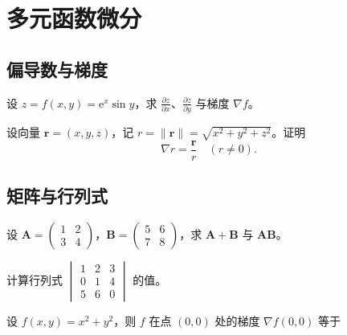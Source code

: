 \documentclass[answersection,pad]{kiritex}
\begin{document}
\section{多元函数微分}

\subsection{偏导数与梯度}

\begin{problem}
  设 $z=f(x,y)=\mathrm{e}^{x}\sin y$，求 $\displaystyle\frac{\partial z}{\partial x}$、$\displaystyle\frac{\partial z}{\partial y}$ 与梯度 $\nabla f$。
\end{problem}

\begin{problem}
  设向量 $\bm{r}=(x,y,z)$，记 $r=\lVert\bm{r}\rVert=\sqrt{x^{2}+y^{2}+z^{2}}$。证明
  \[
  \nabla r=\frac{\bm{r}}{r}\quad(r\neq 0).
  \]
\end{problem}

\subsection{矩阵与行列式}

\begin{problem}
  设 $\bm{A}=\begin{pmatrix}1&2\\3&4\end{pmatrix}$，$\bm{B}=\begin{pmatrix}5&6\\7&8\end{pmatrix}$，求 $\bm{A}+\bm{B}$ 与 $\bm{AB}$。
\end{problem}

\begin{problem}
  计算行列式 $\begin{vmatrix}1&2&3\\0&1&4\\5&6&0\end{vmatrix}$ 的值。
\end{problem}

\begin{problemchoice}
  设 $f(x,y)=x^{2}+y^{2}$，则 $f$ 在点 $(0,0)$ 处的梯度 $\nabla f(0,0)$ 等于
\end{problemchoice}
\end{document}
